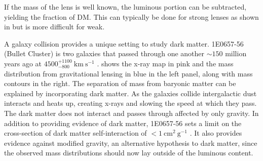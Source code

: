 If the mass of the lens is well known, the luminous portion can be subtracted, yielding the fraction of DM.  This can typically
be done for strong lenses as shown in  but is more difficult for weak.

A galaxy collision provides a unique setting to study dark matter.  1E0657-56 (Bullet Cluster) is two galaxies that passed
through one another $\sim150$ million years ago at $4500_{-800}^{+1100}\ \mathrm{km\ s^{-1}}$ .   shows the x-ray map in pink and the mass
distribution from gravitational lensing in blue in the left panel, along with mass contours in the right.  The separation of
mass from baryonic matter can be explained by incorporating dark matter.  As the galaxies collide intergalactic dust interacts
and heats up, creating x-rays and slowing the speed at which they pass.  The dark matter does not interact and passes
through affected by only gravity.  In addition to providing evidence of dark matter, 1E0657-56 sets a limit on the
cross-section of dark matter self-interaction of $<1\ \mathrm{cm^{2}\ g^{-1}}$ .  It also provides evidence
against modified gravity, an alternative hypothesis to dark matter, since the observed mass distributions should now lay
outside of the luminous content.



